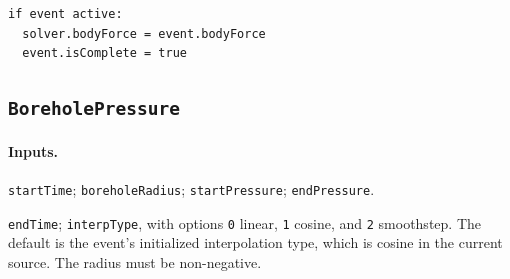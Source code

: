 \begin{lstlisting}[caption={BodyForceUpdate event pseudocode.}]
if event active:
  solver.bodyForce = event.bodyForce
  event.isComplete = true
\end{lstlisting}

\subsection{\texttt{BoreholePressure}}
\label{subsec:event-borehole-pressure}

\paragraph{Inputs.}
\begin{description}[leftmargin=*,style=nextline]
\item[\textbf{Required.}] \texttt{startTime}; \texttt{boreholeRadius}; \texttt{startPressure}; \texttt{endPressure}.
\item[\textbf{Optional.}] \texttt{endTime}; \texttt{interpType}, with options \texttt{0} linear, \texttt{1} cosine, and \texttt{2} smoothstep.  The default is the event's initialized interpolation type, which is cosine in the current source.  The radius must be non-negative.
\end{description}

